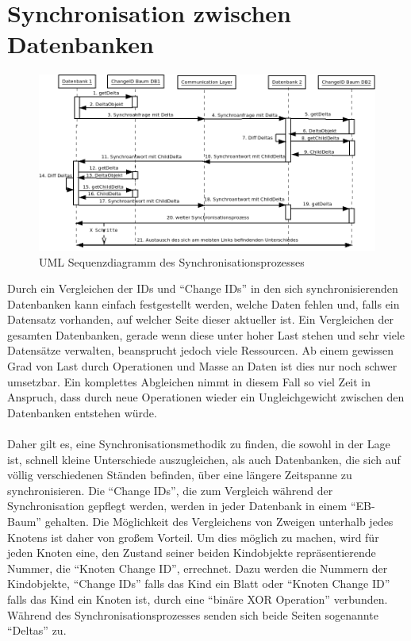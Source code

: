 \documentclass[a4paper,11pt,oneside,%
headsepline,												%
footsepline,												%
bibtotocnumbered									%
]{scrreprt}
\begin{document}
\section{Synchronisation zwischen Datenbanken}
\label{sec:eBTreeSynchronisation}
\begin{figure}[h!]
        \centering
    \includegraphics[width=1\textwidth]{bilder/SynchroProzess.png}
    \caption{UML Sequenzdiagramm des Synchronisationsprozesses}
\end{figure}
Durch ein Vergleichen der IDs und \enquote{Change IDs} in den sich synchronisierenden Datenbanken kann einfach festgestellt werden, welche Daten fehlen und, falls ein Datensatz vorhanden, auf welcher Seite dieser aktueller ist. Ein Vergleichen der gesamten Datenbanken, gerade wenn diese unter hoher Last stehen und sehr viele Datensätze verwalten, beansprucht jedoch viele Ressourcen. Ab einem gewissen Grad von Last durch Operationen und Masse an Daten ist dies nur noch schwer umsetzbar. Ein komplettes Abgleichen nimmt in diesem Fall so viel Zeit in Anspruch, dass durch neue Operationen wieder ein Ungleichgewicht zwischen den Datenbanken entstehen würde.\\\\
Daher gilt es, eine Synchronisationsmethodik zu finden, die sowohl in der Lage ist, schnell kleine Unterschiede auszugleichen, als auch Datenbanken, die sich auf völlig verschiedenen Ständen befinden, über eine längere Zeitspanne zu synchronisieren.
Die \enquote{Change IDs}, die zum Vergleich während der Synchronisation gepflegt werden, werden in jeder Datenbank in einem \enquote{EB-Baum} gehalten. Die Möglichkeit des Vergleichens von Zweigen unterhalb jedes Knotens ist daher von großem Vorteil. Um dies möglich zu machen, wird für jeden Knoten eine, den Zustand seiner beiden Kindobjekte repräsentierende Nummer, die \enquote{Knoten Change ID}, errechnet.
 Dazu werden die Nummern der Kindobjekte, \enquote{Change IDs} falls das Kind ein Blatt oder \enquote{Knoten Change ID} falls das Kind ein Knoten ist, durch eine \enquote{binäre XOR Operation} verbunden. Während des Synchronisationsprozesses senden sich beide Seiten sogenannte \enquote{Deltas} zu. %
\end{document}
